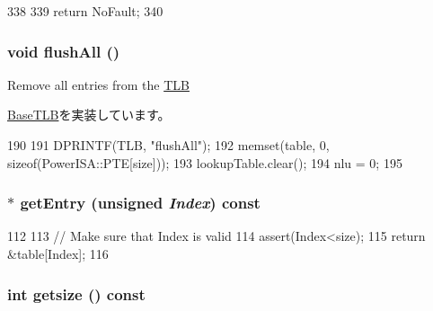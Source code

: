 \begin{DoxyCode}
338 {
339     return NoFault;
340 }
\end{DoxyCode}
\hypertarget{classPowerISA_1_1TLB_aca1483a67aee5a91e442f7131d66bcbd}{
\subsubsection[{flushAll}]{\setlength{\rightskip}{0pt plus 5cm}void flushAll ()}}
\label{classPowerISA_1_1TLB_aca1483a67aee5a91e442f7131d66bcbd}
Remove all entries from the \hyperlink{classPowerISA_1_1TLB}{TLB} 

\hyperlink{classBaseTLB_a5958bc92949a47d1be1088468abdc006}{BaseTLB}を実装しています。


\begin{DoxyCode}
190 {
191     DPRINTF(TLB, "flushAll\n");
192     memset(table, 0, sizeof(PowerISA::PTE[size]));
193     lookupTable.clear();
194     nlu = 0;
195 }
\end{DoxyCode}
\hypertarget{classPowerISA_1_1TLB_a3558ac34fa4e174033d1938edef03e4e}{
\subsubsection[{getEntry}]{ $\ast$ getEntry (unsigned {\em Index}) const}}
\label{classPowerISA_1_1TLB_a3558ac34fa4e174033d1938edef03e4e}



\begin{DoxyCode}
112 {
113     // Make sure that Index is valid
114     assert(Index<size);
115     return &table[Index];
116 }
\end{DoxyCode}
\hypertarget{classPowerISA_1_1TLB_ae121404a6cfcf714e05fe2231ce4c7fc}{
\subsubsection[{getsize}]{\setlength{\rightskip}{0pt plus 5cm}int getsize () const}}
\label{classPowerISA_1_1TLB_ae121404a6cfcf714e05fe2231ce4c7fc}



